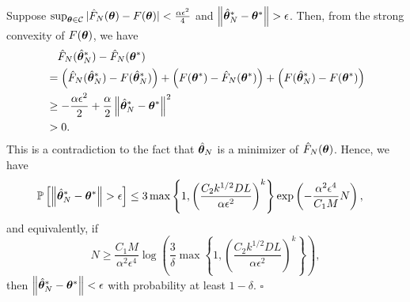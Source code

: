 Suppose $ \sup_{{\bm{\theta}} \in \mathcal{C}}|\hat{F}_N({\bm{\theta}}) - F({\bm{\theta}})| <  \frac{\alpha \epsilon^2}{4}$ and $\left \lVert \hat{{\bm{\theta}}}_N^* - {\bm{\theta}}^* \right \rVert > \epsilon$. Then, from the strong convexity of $F({\bm{\theta}})$, we have
\begin{align*}
    &\quad \hat{F}_N(\hat{{\bm{\theta}}}_N^*) - \hat{F}_N({\bm{\theta}}^*)\\
    &= \left( \hat{F}_N(\hat{{\bm{\theta}}}_N^*) - F(\hat{{\bm{\theta}}}_N^*) \right) + \left( F({\bm{\theta}}^*) - \hat{F}_N({\bm{\theta}}^*)\right) + \left(  F(\hat{{\bm{\theta}}}_N^*) - F({\bm{\theta}}^*) \right)\\
    &\geq -\frac{\alpha \epsilon^2 }{2} + \frac{\alpha}{2} \left \lVert \hat{{\bm{\theta}}}_N^* - {\bm{\theta}}^* \right \rVert^2 \\
    &>0.
\end{align*}
This is a contradiction to the fact that $\hat{{\bm{\theta}}}_N$ is a minimizer of $\hat{F}_N({\bm{\theta}})$. Hence, we have
\begin{align*}
    \mathbb{P} \left[ \left \lVert \hat{{\bm{\theta}}}_N^* - {\bm{\theta}}^* \right \rVert >\epsilon \right] &\leq 3 \max \left \{1, \left(\frac{C_2 k^{1/2} D  L}{\alpha \epsilon^2 }\right)^k \right\} \exp \left( - \frac{\alpha^2 \epsilon^4}{C_1 M}N \right),
\end{align*}
and equivalently, if 
\begin{equation*}
    N \geq \frac{C_1 M}{ \alpha^2 \epsilon^4} \log\left(\frac{3}{\delta} \max \left \{1, \left(\frac{C_2 k^{1/2} D  L}{\alpha \epsilon^2 }\right)^k \right\} \right),
\end{equation*}
then $\left \lVert \hat{{\bm{\theta}}}_N^* - {\bm{\theta}}^* \right \rVert <\epsilon$ with probability at least $1-\delta$.
\hfill $\square$

